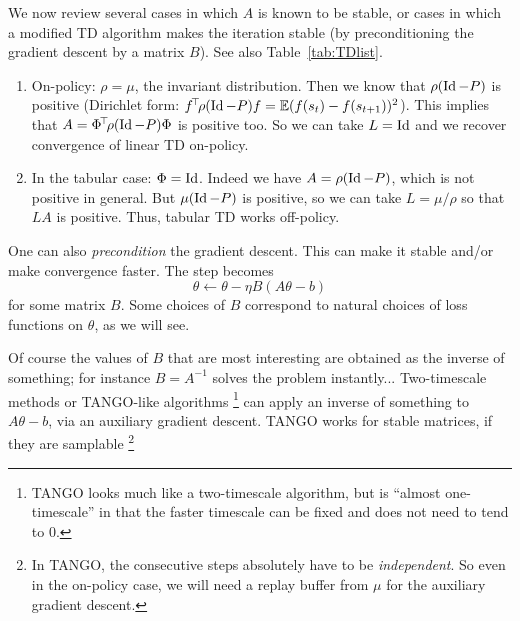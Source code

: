 \documentclass[11pt,a4paper]{article}
\begin{document}
We now review several cases in which $A$ is known to be stable, or cases
in which a modified TD algorithm makes the iteration stable (by
preconditioning the gradient descent by a matrix $B$). See also
Table~\ref{tab:TDlist}.

\begin{enumerate}
\item On-policy: $\rho=\mu$, the invariant distribution. Then we know that $\rho(\operatorname{Id}-P)$ is positive
(Dirichlet form: $f^{\!\top}\!\rho(\operatorname{Id}-P)f=\mathbb{E}(f(s_t)-f(s_{t+1}))^2$). This implies that $A=\Phi^{\!\top}\!\rho (\operatorname{Id}-P)\Phi$ is
positive too. So we can take $L=\operatorname{Id}$ and we recover convergence of linear
TD on-policy.
\item In the tabular case: $\Phi=\operatorname{Id}$. Indeed we have $A=\rho (\operatorname{Id}-P)$,
which is not positive in general. But $\mu (\operatorname{Id}-P)$ is positive, so we can take
$L=\mu/\rho$ so that $LA$ is positive. Thus, tabular TD works
off-policy.
\end{enumerate}

One can also \emph{precondition} the gradient descent. This can make it
stable and/or make convergence faster. The step becomes
\begin{equation}
\theta\gets \theta-\eta B(A\theta-b)
\end{equation}
for some matrix $B$. Some choices of $B$ correspond to natural choices of
loss functions on $\theta$, as we will see.

Of course the values of $B$ that are most interesting are obtained as the
inverse of something; for instance $B=A^{-1}$ solves the problem
instantly... Two-timescale methods or TANGO-like algorithms
\footnote{TANGO looks much like a two-timescale algorithm, but is
``almost one-timescale'' in that the faster timescale can be fixed and
does not need to tend to $0$.} can apply an
inverse of something to $A\theta-b$, via an auxiliary gradient descent.
TANGO works for stable matrices, if they are samplable \footnote{In
TANGO, the consecutive steps absolutely have to be \emph{independent}. So even in
the on-policy case, we will need a replay buffer from $\mu$ for the auxiliary
gradient descent.}
\end{document}
